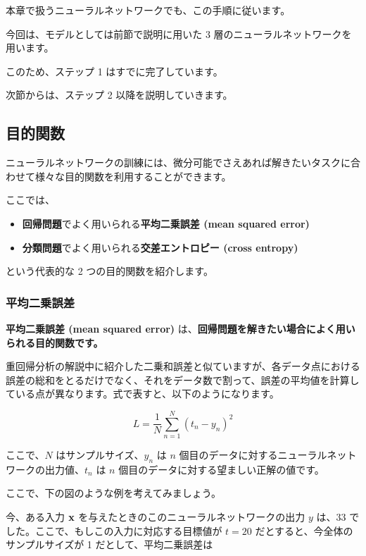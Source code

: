 本章で扱うニューラルネットワークでも、この手順に従います。


今回は、モデルとしては前節で説明に用いた 3 層のニューラルネットワークを用います。

このため、ステップ 1 はすでに完了しています。

次節からは、ステップ 2 以降を説明していきます。


\subsection{目的関数}


ニューラルネットワークの訓練には、微分可能でさえあれば解きたいタスクに合わせて様々な目的関数を利用することができます。

ここでは、


\begin{itemize}
\item \textbf{回帰問題}でよく用いられる\textbf{平均二乗誤差 (mean squared error)}
\item \textbf{分類問題}でよく用いられる\textbf{交差エントロピー (cross entropy)}
\end{itemize}


という代表的な 2 つの目的関数を紹介します。


\subsubsection{平均二乗誤差}


\textbf{平均二乗誤差 (mean squared error)} は、\textbf{回帰問題を解きたい場合によく用いられる目的関数です。}

重回帰分析の解説中に紹介した二乗和誤差と似ていますが、各データ点における誤差の総和をとるだけでなく、それをデータ数で割って、誤差の平均値を計算している点が異なります。式で表すと、以下のようになります。


\[
L = \frac{1}{N} \sum_{n=1}^N (t_n - y_n)^2
\]


ここで、$N$ はサンプルサイズ、$y_n$ は $n$ 個目のデータに対するニューラルネットワークの出力値、$t_n$ は $n$ 個目のデータに対する望ましい正解の値です。


ここで、下の図のような例を考えてみましょう。




今、ある入力 ${\bf x}$ を与えたときのこのニューラルネットワークの出力 $y$ は、$33$ でした。ここで、もしこの入力に対応する目標値が $t = 20$ だとすると、今全体のサンプルサイズが 1 だとして、平均二乗誤差は


